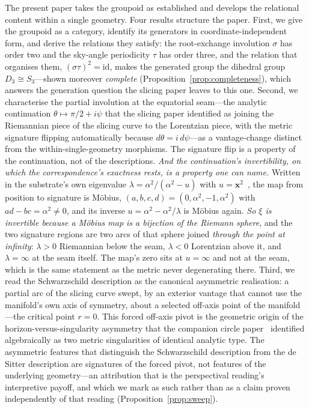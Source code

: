 \documentclass[11pt,a4paper]{article}
\theoremstyle{definition}
\begin{document}
The present paper takes the groupoid as established and develops the relational content within a single geometry. Four results structure the paper. First, we give the groupoid as a category, identify its generators in coordinate-independent form, and derive the relations they satisfy: the root-exchange involution $\sigma$ has order two and the sky-angle periodicity $\tau$ has order three, and the relation that organises them, $(\sigma\tau)^{2}=\mathrm{id}$, makes the generated group the dihedral group $D_{3}\cong S_{3}$---shown moreover \emph{complete} (Proposition~\ref{prop:completeness}), which answers the generation question the slicing paper leaves to this one. Second, we characterise the partial involution at the equatorial seam---the analytic continuation $\theta\mapsto\pi/2+i\psi$ that the slicing paper identified as joining the Riemannian piece of the slicing curve to the Lorentzian piece, with the metric signature flipping automatically because $d\theta=i\,d\psi$---as a vantage-change distinct from the within-single-geometry morphisms. The signature flip is a property of the continuation, not of the descriptions. \emph{And the continuation's invertibility, on which the correspondence's exactness rests, is a property one can name.} Written in the substrate's own eigenvalue $\lambda=\alpha^{2}/(\alpha^{2}-u)$ with $u=\mathbf{x}^{2}$~\cite{JanzenGeometricCore}, the map from position to signature is M\"obius, $(a,b,c,d)=(0,\alpha^{2},-1,\alpha^{2})$ with $ad-bc=\alpha^{2}\neq0$, and its inverse $u=\alpha^{2}-\alpha^{2}/\lambda$ is M\"obius again. \emph{So $\xi$ is invertible because a M\"obius map is a bijection of the Riemann sphere}, and the two signature regions are two arcs of that sphere joined \emph{through the point at infinity}: $\lambda>0$ Riemannian below the seam, $\lambda<0$ Lorentzian above it, and $\lambda=\infty$ at the seam itself. The map's zero sits at $u=\infty$ and not at the seam, which is the same statement as the metric never degenerating there. Third, we read the Schwarzschild description as the canonical asymmetric realisation: a partial arc of the slicing curve swept, by an exterior vantage that cannot use the manifold's own axis of symmetry, about a selected off-axis point of the manifold---the critical point $r=0$. This forced off-axis pivot is the geometric origin of the horizon-versus-singularity asymmetry that the companion circle paper~\cite{JanzenCircle} identified algebraically as two metric singularities of identical analytic type. The asymmetric features that distinguish the Schwarzschild description from the de Sitter description are signatures of the forced pivot, not features of the underlying geometry---an attribution that is the perspectival reading's interpretive payoff, and which we mark as such rather than as a claim proven independently of that reading (Proposition~\ref{prop:sweep}).
\end{document}
